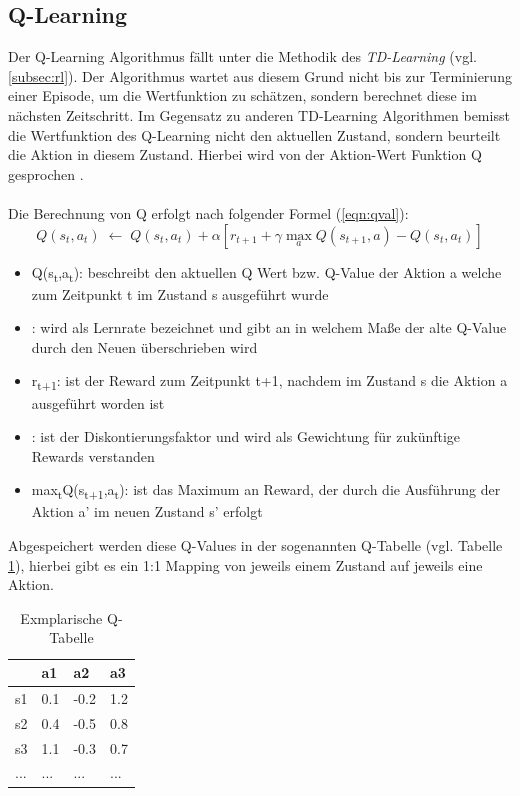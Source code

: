 \subsection{Q-Learning}
\label{subsec:y-ql}
Der Q-Learning Algorithmus fällt unter die Methodik des \textit{TD-Learning} (vgl. \ref{subsec:rl}). Der Algorithmus wartet aus diesem Grund nicht bis zur Terminierung einer Episode, um die Wertfunktion zu schätzen, sondern berechnet diese im nächsten Zeitschritt. Im Gegensatz zu anderen TD-Learning Algorithmen bemisst die Wertfunktion des Q-Learning nicht den aktuellen Zustand, sondern  beurteilt die Aktion in diesem Zustand. Hierbei wird von der Aktion-Wert Funktion Q gesprochen \cite{Sutton}.\\\\
Die Berechnung von Q erfolgt nach folgender Formel (\ref{eqn:qval}):
\begin{equation} \label{eqn:qval}
	Q(s_t,a_t)\;\leftarrow\;Q(s_t,a_t) + \alpha [ r_{t+1} + \gamma \max_a
	Q(s_{t+1},a) - Q(s_t,a_t) ]
\end{equation}
\begin{itemize}
	\item Q(s\textsubscript{t},a\textsubscript{t}): beschreibt den aktuellen Q Wert bzw. Q-Value der Aktion a welche zum Zeitpunkt t im Zustand s ausgeführt wurde
	\item \textalpha: wird als Lernrate bezeichnet und gibt an in welchem Maße der alte Q-Value durch den Neuen überschrieben wird
	\item r\textsubscript{t+1}: ist der Reward zum Zeitpunkt t+1, nachdem im Zustand s die Aktion a ausgeführt worden ist
	\item \textgamma: ist der Diskontierungsfaktor und wird als Gewichtung für zukünftige Rewards verstanden 
	\item max\textsubscript{t}Q(s\textsubscript{t+1},a\textsubscript{t}): ist das Maximum an Reward, der durch die Ausführung der Aktion a' im neuen Zustand s' erfolgt
\end{itemize}

Abgespeichert werden diese Q-Values in der sogenannten Q-Tabelle (vgl. Tabelle \ref{table:qtable}), hierbei gibt es ein 1:1 Mapping von jeweils einem Zustand auf jeweils eine Aktion. 

\begin{table}[h!]
	\begin{center}
		\caption{Exmplarische Q-Tabelle}
		\begin{tabular}{| l | l | l | l |}
			\hline
			    & a1  & a2   & a3  \\ \hline
			s1  & 0.1 & -0.2 & 1.2 \\ \hline
			s2  & 0.4 & -0.5 & 0.8 \\ \hline
			s3  & 1.1 & -0.3 & 0.7 \\ \hline
			... & ... & ...  & ... \\ \hline
		\end{tabular}
		\label{table:qtable}
	\end{center}
\end{table}

